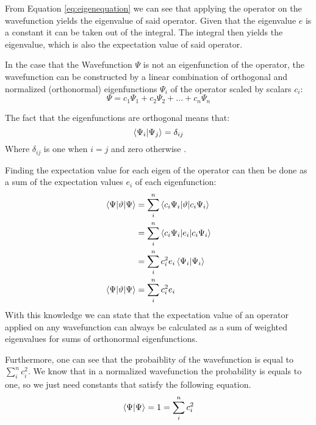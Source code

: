 \documentclass[../master_thesis.tex]{subfiles}
\begin{document}
From Equation \ref{eq:eigenequation} we can see that applying the operator on
the wavefunction yields the eigenvalue of said operator. Given that the
eigenvalue $e$ is a constant it can be taken out of the integral. The integral
then yields the eigenvalue, which is also the expectation value of said
operator.

In the case that the Wavefunction $\Psi$ is not an eigenfunction of the
operator, the wavefunction can be constructed by a linear combination of
orthogonal and normalized (orthonormal\cite{Jensen:2017}) eigenfunctions
$\Psi_i$ of the operator \cite{Atkins:2014} scaled by scalars $c_i$:
\begin{equation}
  \Psi = c_1\Psi_1 + c_2\Psi_2 + ... + c_n\Psi_n
\end{equation}

The fact that the eigenfunctions are orthogonal means that:
\begin{equation}
  \braket{\Psi_i|\Psi_j} = \delta _{ij}
\end{equation}
Where $ \delta_{ij} $ is one when $i=j$ and zero otherwise \cite{Cramer:2004}.

Finding the expectation value for each eigen of the operator can then be done
as a sum of the expectation values $e_i$ of each eigenfunction:
\begin{equation}
  \begin{align}
    \braket{\Psi|\vartheta|\Psi} &=
    \sum\limits_i^n\braket{c_i\Psi_i|\vartheta|c_i\Psi_i} \\
    &= \sum\limits_i^n\braket{c_i\Psi_i|e_i|c_i\Psi_i} \\
    &= \sum\limits_i^nc_i^2e_i\braket{\Psi_i|\Psi_i} \\
    \braket{\Psi|\vartheta|\Psi} &= \sum\limits_i^nc_i^2e_i
  \end{align}
\end{equation}
With this knowledge we can state that the expectation value of an operator
applied on any wavefunction can always be calculated as a sum of weighted
eigenvalues for sums of orthonormal eigenfunctions.

Furthermore, one can see that the probaiblity of the wavefunction is equal to
$\sum_i^nc_i^2$. We know that in a normalized wavefunction the
probability is equals to one, so we just need constants that satisfy the
following equation.
\begin{equation}
  \braket{\Psi|\Psi} = 1 = \sum\limits_i^nc_i^2
\end{equation}
\end{document}

